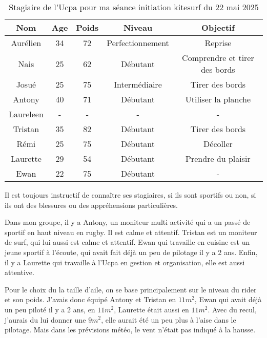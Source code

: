 \documentclass[11pt,a4paper]{report}
\begin{document}
\begin{table}
\begin{tabular}{|c|c|c|c|c|}
        \hline
        \textbf{Nom} & \textbf{Age} & \textbf{Poids}& \textbf{Niveau}     &  \textbf{Objectif} \\ 
        \hline
        Aurélien      &  34          &  72           &   Perfectionnement  & Reprise \\
        Nais          &  25          &  62           &   Débutant          & Comprendre et tirer des bords \\
        Josué         &  25          &  75           &   Intermédiaire     & Tirer des bords \\
        Antony        &  40          &  71           &   Débutant          & Utiliser la planche  \\
        Laureleen     &  -           &  -            &   -                 &   -  \\
        Tristan       &  35          & 82            &  Débutant           & Tirer des bords  \\
        Rémi          &  25          & 75            &  Débutant           &  Décoller  \\
        Laurette      &  29          & 54            &  Débutant           & Prendre du plaisir \\
        Ewan          &  22          & 75            & Débutant            &  -  \\
        \hline
\end{tabular}
\caption{Stagiaire de l'Ucpa pour ma séance initiation kitesurf du 22 mai 2025\label{stagiaires_table}}
\end{table}
Il est toujours instructif de connaître ses stagiaires, si ils sont 
sportifs ou non, si ils ont des blessures ou des appréhensions particulières.

Dans mon groupe, il y a Antony, un moniteur multi activité qui a un passé 
de sportif en haut niveau en rugby. Il est calme et attentif.
Tristan est un moniteur de surf, qui lui aussi est calme et attentif.
Ewan qui travaille en cuisine est un jeune sportif à l'écoute, qui avait 
fait déjà un peu de pilotage il y a 2 ans.
Enfin, il y a Laurette qui travaille à l'Ucpa en gestion et organisation, elle
est aussi attentive.

Pour le choix du la taille d'aile, on se base principalement sur le niveau du rider 
et son poids. J'avais donc équipé Antony et Tristan en $11 m^2$, Ewan qui avait
déjà un peu piloté il y a 2 ans, en $11 m^2$, Laurette était aussi en $11 m^2$.
Avec du recul, j'aurais du lui donner une  $9 m^2$, elle aurait été un peu plus
à l'aise dans le pilotage. Mais dans les prévisions météo, le vent n'était pas
indiqué à la hausse.
\end{document}
